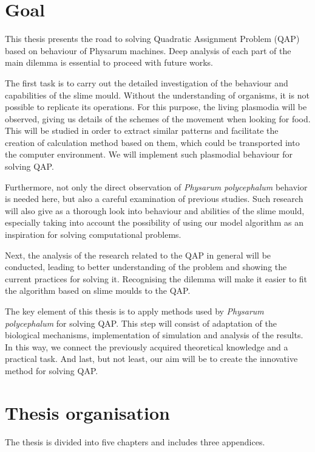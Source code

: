 \documentclass[english,a4paper,twoside]{ppfcmthesis}
\begin{document}
\section{Goal}
\label{section:introduction_goal}

This thesis presents the road to solving Quadratic Assignment Problem (QAP) based on behaviour of Physarum machines.
Deep analysis of each part of the main dilemma is essential to proceed with future works.

The first task is to carry out the detailed investigation of the behaviour and capabilities of the slime mould. Without the understanding of organisms, it is not possible to replicate its operations. For this purpose, the living plasmodia will be observed, giving us details of the schemes of the movement when looking for food. This will be studied in order to extract similar patterns and facilitate the creation of
calculation method based on them, which could be transported into the computer environment. We will implement such plasmodial behaviour for solving QAP.

Furthermore, not only the direct observation of \textit{Physarum polycephalum} behavior is needed here, but also a careful examination of previous studies. Such research will also give as a thorough look into behaviour and abilities of the slime mould, especially taking into account the possibility of using our model algorithm as an inspiration for solving computational problems.

Next, the analysis of the research related to the QAP in general will be conducted, leading to better understanding of the problem and showing the current practices for solving it. Recognising the dilemma will make it easier to fit the algorithm based on slime moulds to the QAP.

The key element of this thesis is to apply methods used by \textit{Physarum polycephalum} for solving QAP. This step will consist of adaptation of the biological mechanisms, implementation of simulation and analysis of the results. In this way, we connect the previously acquired theoretical knowledge and a practical task. And last, but not least, our aim will be to create the innovative method for solving QAP.

\section{Thesis organisation}
\label{section:introduction_chapters}

The thesis is divided into five chapters and includes three appendices.
\end{document}
